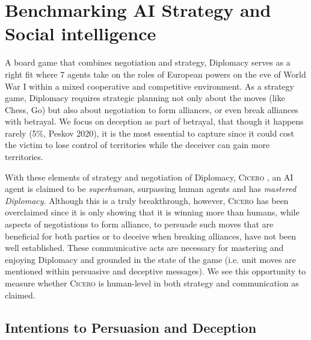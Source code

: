 \documentclass[oneside]{memoir}
\newcommand{\cicero}{\abr{Cicero} }
\newcommand{\abr}[1]{\textsc{#1}}
\begin{document}
\chapter{Benchmarking AI Strategy and Social intelligence}
\label{ch:benchmark_cicero}
A board game that combines negotiation and strategy, Diplomacy serves as a right fit where 7 agents take on the roles of European powers on the eve of World War I within a mixed cooperative and competitive environment. As a strategy game, Diplomacy requires strategic planning not only about the moves (like Chess, Go) but also about negotiation to form alliances, or even break alliances with betrayal. We focus on deception as part of betrayal, that though it happens rarely (5\%, Peskov 2020), it is the most essential to capture since it could cost the victim to lose control of territories while the deceiver can gain more territories.

With these elements of strategy and negotiation of Diplomacy, \cicero, an AI agent is claimed to be \textit{superhuman}, surpassing human agents and has \textit{mastered Diplomacy}. Although this is a truly breakthrough, however, \cicero has been overclaimed since it is only showing that it is winning more than humans, while aspects of negotiations to form alliance, to persuade such moves that are beneficial for both parties or to deceive when breaking alliances, have not been well established. These communicative acts are necessary for mastering and enjoying Diplomacy and grounded in the state of the game (i.e. unit moves are mentioned within persuasive and deceptive messages). We see this opportunity to measure whether \cicero is human-level in both strategy and communication as claimed.

\section{Intentions to Persuasion and Deception}
\end{document}
